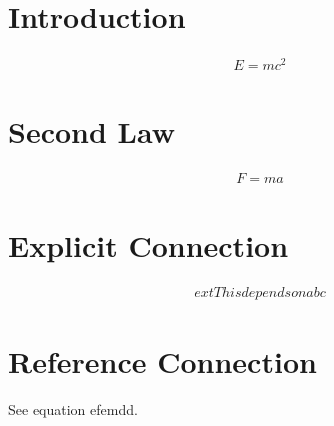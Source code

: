 \section{Introduction}
\begin{gather}\label{abc}
    E = mc^2
\end{gather}

\section{Second Law}
\begin{gather}\label{emdd}
    F = ma
\end{gather}


\section{Explicit Connection}
\begin{gather}\label{rel1}%
    	ext{This depends on abc}
\end{gather}


\section{Reference Connection}
See equation 
ef{emdd}. \label{ref_node}

